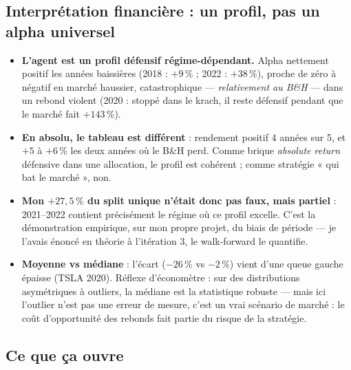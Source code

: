 \documentclass[11pt,a4paper]{article}
\begin{document}
\subsection{Interprétation financière : un profil, pas un alpha universel}

\begin{itemize}[itemsep=3pt]
  \item \textbf{L'agent est un profil défensif régime-dépendant.} Alpha nettement
        positif les années baissières (2018 : $+9\,\%$ ; 2022 : $+38\,\%$), proche de
        zéro à négatif en marché haussier, catastrophique --- \emph{relativement au
        B\&H} --- dans un rebond violent (2020 : stoppé dans le krach, il reste
        défensif pendant que le marché fait $+143\,\%$).
  \item \textbf{En absolu, le tableau est différent} : rendement positif 4 années sur 5,
        et $+5$ à $+6\,\%$ les deux années où le B\&H perd. Comme brique
        \emph{absolute return} défensive dans une allocation, le profil est cohérent ;
        comme stratégie « qui bat le marché », non.
  \item \textbf{Mon $+27{,}5\,\%$ du split unique n'était donc pas faux, mais
        partiel} : 2021--2022 contient précisément le régime où ce profil excelle.
        C'est la démonstration empirique, sur mon propre projet, du biais de période
        --- je l'avais énoncé en théorie à l'itération 3, le walk-forward le quantifie.
  \item \textbf{Moyenne vs médiane} : l'écart ($-26\,\%$ vs $-2\,\%$) vient d'une queue
        gauche épaisse (TSLA 2020). Réflexe d'économètre : sur des distributions
        asymétriques à outliers, la médiane est la statistique robuste --- mais ici
        l'outlier n'est pas une erreur de mesure, c'est un vrai scénario de marché :
        le coût d'opportunité des rebonds fait partie du risque de la stratégie.
\end{itemize}

\subsection{Ce que ça ouvre}
\end{document}
